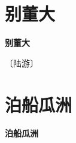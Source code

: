 \documentclass[12pt,UTF-8,openany,fontset=none]{ctexbook}
\begin{document}
\vspace{8pt}
\clearpage

\section{别董大}



\begin{center}
    {\bfseries 别董大}
\end{center}

\begin{center}
    \vspace{10pt}
    
    \begin{large}
        
        〔陆游〕
        
    \end{large}
    
    \vspace{8pt}
    
    \begin{huge}
        
        \phantom{。}

        \phantom{。}
        
        \phantom{。}

        \phantom{...} \!\! {}
        
    \end{huge}
    
\end{center}

\vspace{8pt}
\clearpage


\section{泊船瓜洲}



\begin{center}
    {\bfseries 泊船瓜洲}
\end{center}
\end{document}
